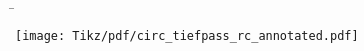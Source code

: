 \begin{frame}
{    %
}%
\b{%
    \noindent\begin{minipage}[t]{\textwidth}
        \begin{minipage}[t]{\dimexpr0.5\textwidth-\Colsep\relax}%
            \centering\vspace{0pt}%
            \texttt{[image: Tikz/pdf/circ\_tiefpass\_rc\_annotated.pdf]}


\end{minipage}
\end{minipage}}
\end{frame}
